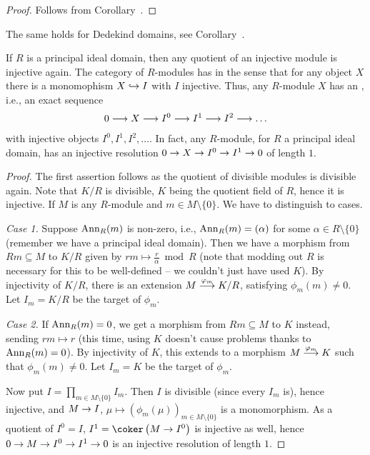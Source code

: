 \documentclass[a4paper,parskip=half,numbers=enddot, DIV=12]{scrreprt}
\begin{document}
\begin{proof}
	Follows from Corollary~.
\end{proof}
\begin{rem*}
	The same holds for Dedekind domains, see Corollary~.
\end{rem*}
\begin{cor}
	If $R$ is a principal ideal domain, then any quotient of an injective module is injective again. The category of $R$-modules has  in the sense that for any object $X$ there is a monomophism $X\monomorphism I$ with $I$ injective. Thus, any $R$-module $X$ has an , i.e., an exact sequence
	\begin{align*}
	0\morphism X\morphism I^0\morphism I^1\morphism I^2\morphism\ldots
	\end{align*}
	with injective objects $I^0,I^1,I^2,\ldots$. In fact, any $R$-module, for $R$ a principal ideal domain, has an injective resolution $0\morphism X\morphism I^0\morphism I^1\morphism 0$ of length $1$.
\end{cor}
\begin{proof}
	The first assertion follows as the quotient of divisible modules is divisible again. Note that $K/R$ is divisible, $K$ being the quotient field of $R$, hence it is injective. If $M$ is any $R$-module and $m\in M\setminus\{0\}$. We have to distinguish to cases.
	
	\emph{Case 1.} Suppose $\operatorname{Ann}_R(m)$ is non-zero, i.e., $\operatorname{Ann}_R(m)=(\alpha)$ for some $\alpha\in R\setminus \{0\}$ (remember we have a principal ideal domain). Then we have a morphism from $Rm\subseteq M$ to $K/R$ given by $rm\mapsto \frac{r}{\alpha}\bmod R$ (note that modding out $R$ is necessary for this to be well-defined -- we couldn't just have used $K$). By injectivity of $K/R$, there is an extension $M\morphism[\phi_m]K/R$, satisfying $\phi_m(m)\neq 0$. Let $I_m= K/R$ be the target of $\phi_m$.
	
	\emph{Case 2.} If $\operatorname{Ann}_R(m)=0$, we get a morphism from $Rm\subseteq M$ to $K$ instead, sending $rm\mapsto r$ (this time, using $K$ doesn't cause problems thanks to $\operatorname{Ann}_R(m)=0$). By injectivity of $K$, this extends to a morphism $M\morphism[\phi_m]K$ such that $\phi_m(m)\neq0$. Let $I_m=K$ be the target of $\phi_m$.
	
	Now put $I=\prod_{m\in M\setminus\{0\}}I_m$. Then $I$ is divisible (since every $I_m$ is), hence injective, and $M\morphism I$, $\mu\mapsto\left(\phi_m(\mu)\right)_{m\in M\setminus\{0\}}$ is a monomorphism. As a quotient of $I^0=I$, $I^1=\coker\left(M\morphism I^0\right)$ is injective as well, hence $0\morphism M\morphism I^0\morphism I^1\morphism 0$ is an injective resolution of length $1$.
\end{proof}
\end{document}
